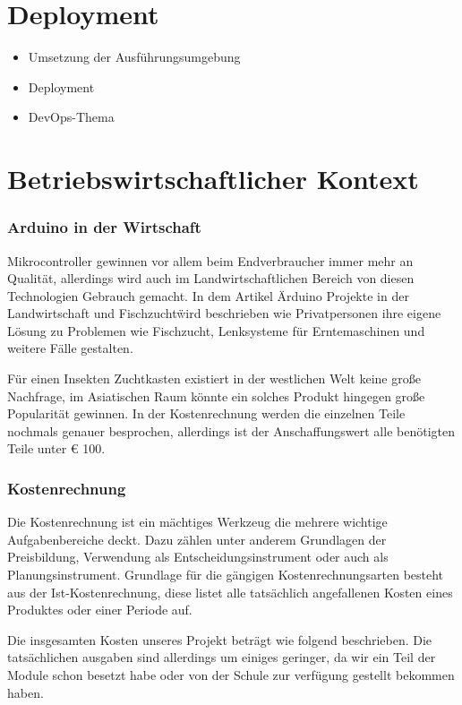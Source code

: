 \chapter{Deployment}
\begin{itemize}
	\item Umsetzung der Ausführungsumgebung
	\item Deployment
	\item DevOps-Thema
\end{itemize}


\newpage
\chapter{Betriebswirtschaftlicher Kontext}


\def \currentAuthor {Kevin Glatz}
\subsection{Arduino in der Wirtschaft}
Mikrocontroller gewinnen vor allem beim Endverbraucher immer mehr an Qualität, allerdings wird auch im Landwirtschaftlichen Bereich von diesen Technologien Gebrauch gemacht. In dem Artikel \"Arduino Projekte in der Landwirtschaft und Fischzucht\" wird beschrieben wie Privatpersonen ihre eigene Lösung zu Problemen wie Fischzucht, Lenksysteme für Erntemaschinen und weitere Fälle gestalten. 
\cite{ArdAgra}

Für einen Insekten Zuchtkasten existiert in der westlichen Welt keine große Nachfrage, im Asiatischen Raum könnte ein solches Produkt hingegen große Popularität gewinnen. In der Kostenrechnung werden die einzelnen Teile nochmals genauer besprochen, allerdings ist der Anschaffungswert alle benötigten Teile unter € 100. 

\subsection{Kostenrechnung}

Die Kostenrechnung ist ein mächtiges Werkzeug die mehrere wichtige Aufgabenbereiche deckt. Dazu zählen unter anderem Grundlagen der Preisbildung, Verwendung als Entscheidungsinstrument oder auch als Planungsinstrument. Grundlage für die gängigen Kostenrechnungsarten besteht aus der Ist-Kostenrechnung, diese listet alle tatsächlich angefallenen Kosten eines Produktes oder einer Periode auf. \cite{KORE}

Die insgesamten Kosten unseres Projekt beträgt wie folgend beschrieben. Die tatsächlichen ausgaben sind allerdings um einiges geringer, da wir ein Teil der Module schon besetzt habe oder von der Schule zur verfügung gestellt bekommen haben.



